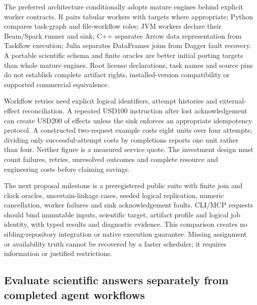 The preferred architecture conditionally adopts mature engines behind
explicit worker contracts. R pairs tabular workers with targets where
appropriate; Python compares task-graph and file-workflow roles; JVM
workers declare their Beam/Spark runner and sink; C++ separates Arrow
data representation from Taskflow execution; Julia separates DataFrames
joins from Dagger fault recovery. A portable scientific schema and
finite oracles are better initial porting targets than whole mature
engines. Root license declarations, task names and source pins do not
establish complete artifact rights, installed-version compatibility or
supported commercial equivalence.
\citep{exec25_dww_datatable,exec25_dww_targets,exec25_dww_dask,exec25_dww_snakemake,exec25_dww_beam,exec25_dww_arrow,exec25_dww_taskflow,exec25_dww_dataframes,exec25_dww_dagger}

Workflow retries need explicit logical identifiers, attempt histories
and external-effect reconciliation. A repeated USD100 instruction after
lost acknowledgement can create USD200 of effects unless the sink
enforces an appropriate idempotency protocol. A constructed two-request
example costs eight units over four attempts; dividing only
successful-attempt costs by completions reports one unit rather than
four. Neither figure is a measured service quote. The investment design
must count failures, retries, unresolved outcomes and complete resource
and engineering costs before claiming savings. \citep{exec25_dww_choice}

The next proposal milestone is a preregistered public suite with finite
join and clock oracles, uncertain-linkage cases, seeded logical
replication, numeric cancellation, worker failures and sink
acknowledgement faults. CLI/MCP requests should bind immutable inputs,
scientific target, artifact profile and logical job identity, with typed
results and diagnostic evidence. This comparison creates no
sibling-repository integration or native execution guarantee. Missing
assignment or availability truth cannot be recovered by a faster
scheduler; it requires information or justified restrictions.
\citep{exec25_dww_choice}

\hypertarget{evaluate-scientific-answers-separately-from-completed-agent-workflows}{%
\subsection{Evaluate scientific answers separately from completed agent
workflows}\label{evaluate-scientific-answers-separately-from-completed-agent-workflows}}

